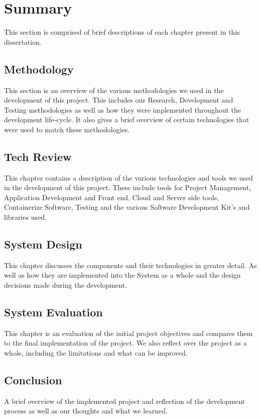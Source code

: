 \section{Summary}
This section is comprised of brief descriptions of each chapter present in this dissertation.
\subsection{Methodology}
This section is an overview of the various methodologies we used in the development of this project. This includes our Research, Development and Testing methodologies as well as how they were implemented throughout the development life-cycle. It also gives a brief overview of certain technologies that were used to match these methodologies.

\subsection{Tech Review}
This chapter contains a description of the various technologies and tools we used in the development of this project. These include tools for Project Management, Application Development and Front end, Cloud and Server side tools, Containerize Software, Testing and the various Software Development Kit's and libraries used. 

\subsection{System Design}
This chapter discusses the components and their technologies in greater detail. As well as how they are implemented into the System as a whole and the design decisions made during the development.

\subsection{System Evaluation}
This chapter is an evaluation of the initial project objectives and compares them to the final implementation of the project. We also reflect over the project as a whole, including the limitations and what can be improved.

\subsection{Conclusion}
A brief overview of the implemented project and reflection of the development process as well as our thoughts and what we learned.

